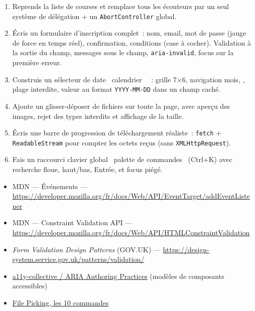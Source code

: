 \documentclass[12pt,a4paper,twoside,openright]{book}
\newcommand{\link}[2]{\href{#2}{#1}}
\begin{document}
\begin{exercice}
\begin{enumerate}
  \item Reprends la liste de courses et remplace tous les \'ecouteurs par un seul syst\`eme de
        d\'el\'egation + un \verb|AbortController| global.
  \item \'Ecris un formulaire d'inscription complet~: nom, email, mot de passe (jauge de force
        en temps r\'eel), confirmation, conditions (case \`a cocher). Validation \`a la sortie du champ,
        messages sous le champ, \verb|aria-invalid|, focus sur la premi\`ere erreur.
  \item Construis un s\'electeur de date \og ~calendrier~ \fg{}~: grille 7$\times$6, navigation mois,
         , plage interdite, valeur au format \verb|YYYY-MM-DD| dans un champ cach\'e.
  \item Ajoute un glisser-d\'eposer de fichiers sur toute la page, avec aper\c{c}u des images,
        rejet des types interdits et affichage de la taille.
  \item \'Ecris une barre de progression de t\'el\'echargement r\'ealiste~: \verb|fetch| +
        \verb|ReadableStream| pour compter les octets re\c{c}us (sans \verb|XMLHttpRequest|).
  \item Fais un raccourci clavier global \og ~palette de commandes~ \fg{} (Ctrl+K) avec recherche
        floue, haut/bas, Entr\'ee, et focus pi\'eg\'e.
\end{enumerate}
\end{exercice}

\begin{ressources}
\begin{itemize}
  \item MDN --- \'Ev\'enements --- \url{https://developer.mozilla.org/fr/docs/Web/API/EventTarget/addEventListener}
  \item MDN --- Constraint Validation API --- \url{https://developer.mozilla.org/fr/docs/Web/API/HTMLConstraintValidation}
  \item \emph{Form Validation Design Patterns} (GOV.UK) --- \url{https://design-system.service.gov.uk/patterns/validation/}
  \item \link{a11y-collective / ARIA Authoring Practices}{https://www.w3.org/WAI/ARIA/apg/patterns/} (mod\`eles de composants accessibles)
  \item \link{File Picking, les 10 commandes}{https://web.dev/file-system-access/}
\end{itemize}
\end{ressources}
\end{document}
